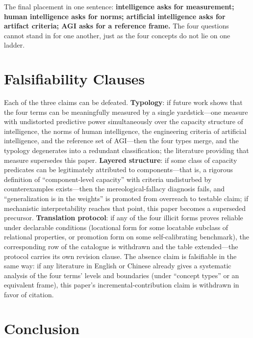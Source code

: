 \documentclass[10pt]{article}
\begin{document}
The final placement in one sentence: \textbf{intelligence asks for measurement; human intelligence asks for norms; artificial intelligence asks for artifact criteria; AGI asks for a reference frame.} The four questions cannot stand in for one another, just as the four concepts do not lie on one ladder.

\section{Falsifiability Clauses}\label{sec:falsify}

Each of the three claims can be defeated. \textbf{Typology}: if future work shows that the four terms can be meaningfully measured by a single yardstick---one measure with undistorted predictive power simultaneously over the capacity structure of intelligence, the norms of human intelligence, the engineering criteria of artificial intelligence, and the reference set of AGI---then the four types merge, and the typology degenerates into a redundant classification; the literature providing that measure supersedes this paper. \textbf{Layered structure}: if some class of capacity predicates can be legitimately attributed to components---that is, a rigorous definition of ``component-level capacity'' with criteria undisturbed by counterexamples exists---then the mereological-fallacy diagnosis fails, and ``generalization is in the weights'' is promoted from overreach to testable claim; if mechanistic interpretability reaches that point, this paper becomes a superseded precursor. \textbf{Translation protocol}: if any of the four illicit forms proves reliable under declarable conditions (locational form for some locatable subclass of relational properties, or promotion form on some self-calibrating benchmark), the corresponding row of the catalogue is withdrawn and the table extended---the protocol carries its own revision clause. The absence claim is falsifiable in the same way: if any literature in English or Chinese already gives a systematic analysis of the four terms' levels and boundaries (under ``concept types'' or an equivalent frame), this paper's incremental-contribution claim is withdrawn in favor of citation.

\section{Conclusion}
\end{document}
